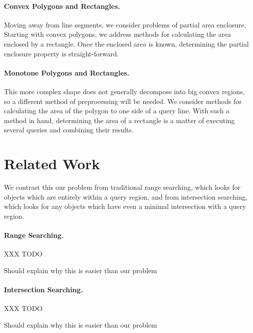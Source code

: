 \paragraph{Convex Polygons and Rectangles.} Moving away from line segments, we consider problems of partial area enclosure. 
Starting with convex polygons, we address methods for calculating the area enclosed by a rectangle. 
Once the enclosed area is known, determining the partial enclosure property is straight-forward.
 
\paragraph{Monotone Polygons and Rectangles.} This more complex shape does not generally decompose into big convex regions, so a different method of preprocessing will be needed.
We consider methods for calculating the area of the polygon to one side of a query line. 
With such a method in hand, determining the area of a rectangle is a matter of executing several queries and combining their results.

\section{Related Work}
\label{:intro:related}

We contrast this our problem from traditional range searching, which looks for objects which are entirely within a query region, and from intersection searching, which looks for any objects which have even a minimal intersection with a query region.

\paragraph{Range Searching.} 
XXX TODO

Should explain why this is easier than our problem

\paragraph{Intersection Searching.} 
XXX TODO

Should explain why this is easier than our problem


